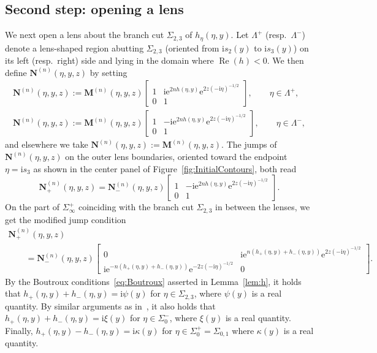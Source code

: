 \documentclass[pdftex]{sigma}
\numberwithin{equation}{section}
\begin{document}
\subsection{Second step: opening a lens}
We next open a lens about the branch cut $\Sigma_{2,3}$ of $h_\eta(\eta,y)$. Let $\Lambda^+$ (resp.\ $\Lambda^-$) denote a lens-shaped region abutting $\Sigma_{2,3}$ (oriented from $\mathrm{i} s_2(y)$ to $\mathrm{i} s_3(y)$) on its left (resp.\ right) side and lying in the domain where $\operatorname{Re}(h)<0$. We then define $\mathbf{N}^{(n)}(\eta,y,z)$ by setting
\begin{gather*}
\mathbf{N}^{(n)}(\eta,y,z):=\mathbf{M}^{(n)}(\eta,y,z)\begin{bmatrix}1&\mathrm{i}\mathrm{e}^{2nh(\eta,y)}\mathrm{e}^{2z(-\mathrm{i}\eta)^{-1/2}}\\0&1\end{bmatrix},\qquad \eta\in\Lambda^+,
\\
\mathbf{N}^{(n)}(\eta,y,z):=\mathbf{M}^{(n)}(\eta,y,z)\begin{bmatrix}1&-\mathrm{i}\mathrm{e}^{2nh(\eta,y)}\mathrm{e}^{2z(-\mathrm{i}\eta)^{-1/2}}\\0&1\end{bmatrix},\qquad\eta\in\Lambda^-,
\end{gather*}
and elsewhere we take $\mathbf{N}^{(n)}(\eta,y,z):=\mathbf{M}^{(n)}(\eta,y,z)$. The jumps of $\mathbf{N}^{(n)}(\eta,y,z)$ on the outer lens boundaries, oriented toward the endpoint $\eta=\mathrm{i} s_3$ as shown in the center panel of Figure~\ref{fig:InitialContours}, both read
\begin{equation*}
\mathbf{N}^{(n)}_+(\eta,y,z)=\mathbf{N}^{(n)}_-(\eta,y,z)\begin{bmatrix}1&-\mathrm{i}\mathrm{e}^{2nh(\eta,y)}\mathrm{e}^{2z(-\mathrm{i}\eta)^{-1/2}}\\0&1\end{bmatrix}.
\end{equation*}
On the part of $\Sigma_\infty^+$ coinciding with the branch cut $\Sigma_{2,3}$ in between the lenses, we get the modified jump condition
\begin{gather*}
\mathbf{N}^{(n)}_+(\eta,y,z) \\
\qquad
=\mathbf{N}^{(n)}_-(\eta,y,z)\begin{bmatrix}0 & \mathrm{i}\mathrm{e}^{n(h_+(\eta,y)+h_-(\eta,y))}\mathrm{e}^{2z(-\mathrm{i}\eta)^{-1/2}}\\\mathrm{i}\mathrm{e}^{-n(h_+(\eta,y)+h_-(\eta,y))}\mathrm{e}^{-2z(-\mathrm{i}\eta)^{-1/2}} & 0\end{bmatrix}.
\end{gather*}
By the Boutroux conditions~\eqref{eq:Boutroux} asserted in Lemma~\ref{lem:h}, it holds that $h_+(\eta,y)+h_-(\eta,y)=\mathrm{i}\psi(y)$ for $\eta\in\Sigma_{2,3}$, where $\psi(y)$ is a real quantity. By similar arguments as in~\cite{BuckinghamM22}, it also holds that $h_+(\eta,y)+h_-(\eta,y)=\mathrm{i}\xi(y)$ for $\eta\in\Sigma_0^-$, where $\xi(y)$ is a real quantity. Finally, $h_+(\eta,y)-h_-(\eta,y)=\mathrm{i}\kappa(y)$ for $\eta\in\Sigma_0^+=\Sigma_{0,1}$ where $\kappa(y)$ is a real quantity.
\end{document}
